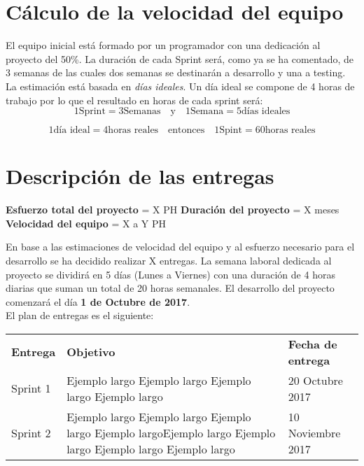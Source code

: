 \section{Cálculo de la velocidad del equipo}

El equipo inicial está formado por un programador con una dedicación al proyecto del 50\%. La duración de cada Sprint será, como ya se ha comentado, de 3 semanas de las cuales dos semanas se destinarán a desarrollo y una a testing.\\

La estimación está basada en \textit{días ideales}. Un día ideal se compone de 4 horas de trabajo por lo que el resultado en horas de cada  sprint será:\\

\[
1 \textrm{Sprint} = 3 \textrm{Semanas} \quad \textrm{y} \quad 1 \textrm{Semana} = 5 \textrm{días ideales}
\]

\[
1 \textrm{día ideal} = 4 \textrm{horas reales} \quad \textrm{entonces} \quad 1 \textrm{Spint} = 60 \textrm{horas reales}
\]

\section{Descripción de las entregas}

\textbf{Esfuerzo total del proyecto} = X PH
\textbf{Duración del proyecto} = X meses
\textbf{Velocidad del equipo} = X a Y PH

En base a las estimaciones de velocidad del equipo y al esfuerzo necesario para el desarrollo se ha decidido realizar X entregas. La semana laboral dedicada al proyecto se dividirá en 5 días (Lunes a Viernes) con una duración de 4 horas diarias que suman un total de 20 horas semanales. El desarrollo del proyecto comenzará el día \textbf{1 de Octubre de 2017}.\\


El plan de entregas es el siguiente:

\begin{table}[h]
	\centering
	\begin{tabular}{| p{1.4cm} | p{6.7cm} | p{3.2cm} |}
		\rowcolor[HTML]{329A9D} 
		{\color[HTML]{FFFFFF} \textbf{Entrega}} & {\color[HTML]{FFFFFF} \textbf{Objetivo}} & {\color[HTML]{FFFFFF} \textbf{Fecha de entrega}} \\    
		Sprint 1 & Ejemplo largo Ejemplo largo Ejemplo largo Ejemplo largo  & 20 Octubre 2017 \\ \hline
		Sprint 2 & Ejemplo largo Ejemplo largo Ejemplo largo Ejemplo largoEjemplo largo Ejemplo largo Ejemplo largo Ejemplo largo  & 10 Noviembre 2017 \\ 
		\hline              
	\end{tabular}
\end{table}

